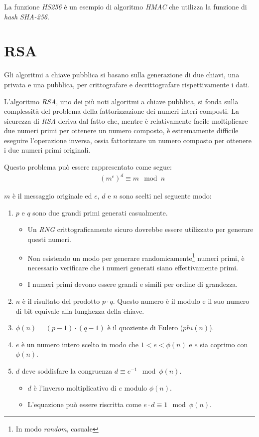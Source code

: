 \noindent La funzione \emph{HS256} è un esempio di algoritmo \emph{HMAC} che utilizza la funzione di \emph{hash} \emph{SHA-256}.


\section{RSA}
Gli algoritmi a chiave pubblica si basano sulla generazione di due chiavi, una privata e una pubblica, per crittografare e decrittografare rispettivamente i dati.

L'algoritmo \emph{RSA}, uno dei più noti algoritmi a chiave pubblica, si fonda sulla complessità del problema della fattorizzazione dei numeri interi composti.
La sicurezza di \emph{RSA} deriva dal fatto che, mentre è relativamente facile moltiplicare due numeri primi per ottenere un numero composto, è estremamente difficile eseguire l'operazione inversa, ossia fattorizzare un numero composto per ottenere i due numeri primi originali.

\noindent Questo problema può essere rappresentato come segue:
\begin{equation}
	\begin{aligned}
		&(m^e)^d \equiv m \mod n
	\end{aligned}
\end{equation}

\noindent $m$ è il messaggio originale ed $e$, $d$ e $n$ sono scelti nel seguente modo:
\begin{enumerate}
	\item $p$ e $q$ sono due grandi primi generati casualmente.
	      \begin{itemize}
		      \item Un \emph{\gls{RNG}} crittograficamente sicuro dovrebbe essere utilizzato per generare questi numeri.
		      \item Non esistendo un modo per generare randomicamente\footnote{In modo \emph{random}, casuale} numeri primi, è necessario verificare che i numeri generati siano effettivamente primi.
		      \item I numeri primi devono essere grandi e simili per ordine di grandezza.
	      \end{itemize}
	\item $n$ è il risultato del prodotto $p \cdot q$. Questo numero è il modulo e il suo numero di bit equivale alla lunghezza della chiave.
	\item $\phi(n) = (p - 1) \cdot (q - 1)$ è il quoziente di Eulero ($phi(n)$).
	\item $e$ è un numero intero scelto in modo che $1 < e < \phi(n)$ e $e$ sia coprimo con $\phi(n)$.
	\item $d$ deve soddisfare la congruenza $d \equiv e^{-1} \mod \phi(n)$.
	      \begin{itemize}
		      \item $d$ è l'inverso moltiplicativo di $e$ modulo $\phi(n)$.
		      \item L'equazione può essere riscritta come $e \cdot d \equiv 1 \mod \phi(n)$.
	      \end{itemize}
\end{enumerate}

